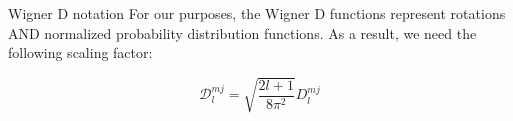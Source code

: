 \documentclass[11pt]{article}
\begin{document}
\begin{flushleft}







\begin{section}{Wigner D notation}
For our purposes, the Wigner D functions represent rotations AND normalized probability distribution functions. As a result, we need the following scaling factor:

\begin{equation*}
{\mathcal{D}}^{mj}_{l} = \sqrt{\frac{2l+1}{8\pi^2}}D^{mj}_{l}
\end{equation*}


\end{section}
\end{flushleft}
\end{document}
